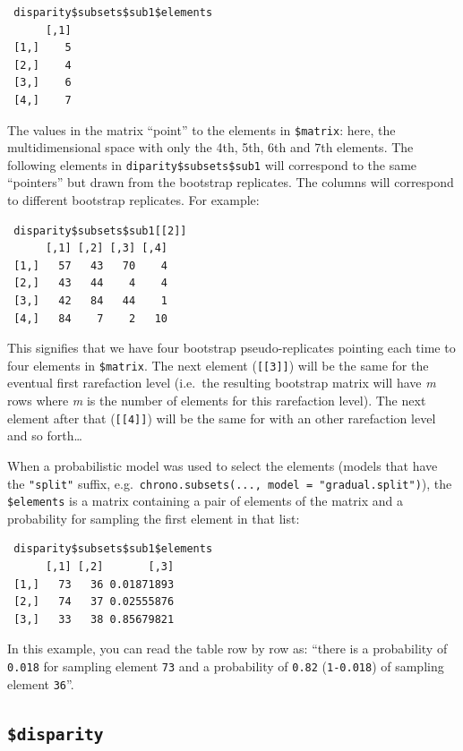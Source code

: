 \documentclass[
]{book}
\begin{document}
\begin{verbatim}
 disparity$subsets$sub1$elements
      [,1]
 [1,]    5
 [2,]    4
 [3,]    6
 [4,]    7
\end{verbatim}

The values in the matrix ``point'' to the elements in \texttt{\$matrix}: here, the multidimensional space with only the 4th, 5th, 6th and 7th elements.
The following elements in \texttt{diparity\$subsets\$sub1} will correspond to the same ``pointers'' but drawn from the bootstrap replicates.
The columns will correspond to different bootstrap replicates.
For example:

\begin{verbatim}
 disparity$subsets$sub1[[2]]
      [,1] [,2] [,3] [,4]
 [1,]   57   43   70    4
 [2,]   43   44    4    4
 [3,]   42   84   44    1
 [4,]   84    7    2   10
\end{verbatim}

This signifies that we have four bootstrap pseudo-replicates pointing each time to four elements in \texttt{\$matrix}.
The next element (\texttt{{[}{[}3{]}{]}}) will be the same for the eventual first rarefaction level (i.e.~the resulting bootstrap matrix will have \emph{m} rows where \emph{m} is the number of elements for this rarefaction level).
The next element after that (\texttt{{[}{[}4{]}{]}}) will be the same for with an other rarefaction level and so forth\ldots{}

When a probabilistic model was used to select the elements (models that have the \texttt{"split"} suffix, e.g.~\texttt{chrono.subsets(...,\ model\ =\ "gradual.split")}), the \texttt{\$elements} is a matrix containing a pair of elements of the matrix and a probability for sampling the first element in that list:

\begin{verbatim}
 disparity$subsets$sub1$elements
      [,1] [,2]       [,3]
 [1,]   73   36 0.01871893
 [2,]   74   37 0.02555876
 [3,]   33   38 0.85679821
\end{verbatim}

In this example, you can read the table row by row as: ``there is a probability of \texttt{0.018} for sampling element \texttt{73} and a probability of \texttt{0.82} (\texttt{1-0.018}) of sampling element \texttt{36}''.

\hypertarget{disparity}{%
\subsection{\texorpdfstring{\texttt{\$disparity}}{\$disparity}}\label{disparity}}
\end{document}

